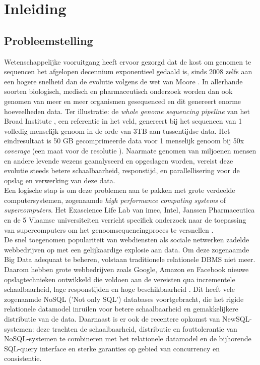 \chapter{Inleiding}
\label{cha:1}

\section{Probleemstelling}

Wetenschappelijke vooruitgang heeft ervoor gezorgd dat de kost om genomen te sequencen het afgelopen decennium exponentieel gedaald is, sinds 2008 zelfs aan een hogere snelheid dan de evolutie volgens de wet van Moore \cite{wetterstrand_sequencing_cost}. In allerhande soorten biologisch, medisch en pharmaceutisch onderzoek worden dan ook genomen van meer en meer organismen gesequenced en dit genereert enorme hoeveelheden data. Ter illustratie: de \textit{whole genome sequencing pipeline} van het Broad Institute \cite{broad_institute}, een referentie in het veld, genereert bij het sequencen van 1 volledig menselijk genoom in de orde van 3TB aan tussentijdse data. Het eindresultaat is 50 GB gecomprimeerde data voor 1 menselijk genoom bij 50x \textit{coverage} (een maat voor de resolutie \cite{coverage_definition}). Naarmate genomen van miljoenen mensen en andere levende wezens geanalyseerd en opgeslagen worden, vereist deze evolutie steeds betere schaalbaarheid, responstijd, en parallellisering voor de opslag en verwerking van deze data.\\
Een logische stap is om deze problemen aan te pakken met grote verdeelde computersystemen, zogenaamde \textit{high performance computing systems} of \textit{supercomputers}. Het Exascience Life Lab van imec, Intel, Janssen Pharmaceutica en de 5 Vlaamse universiteiten verricht specifiek onderzoek naar de toepassing van supercomputers om het genoomsequencingproces te versnellen \cite{lifelab_bwa}\cite{exascience_life_lab}.\\
De snel toegenomen populariteit van webdiensten als sociale netwerken zadelde webbedrijven op met een gelijkaardige explosie aan data. Om deze zogenaamde Big Data \cite{mashey1997big} adequaat te beheren, volstaan traditionele relationele DBMS niet meer. Daarom hebben grote webbedrijven zoals Google, Amazon en Facebook nieuwe opslagtechnieken ontwikkeld die voldoen aan de vereisten qua incrementele schaalbaarheid, lage responstijden en hoge beschikbaarheid \cite{baker2011megastore}. Dit heeft vele zogenaamde NoSQL ('Not only SQL') databases voortgebracht, die het rigide relationele datamodel inruilen voor betere schaalbaarheid en gemakkelijkere distributie van de data. Daarnaast is er ook de recentere opkomst van NewSQL-systemen: deze trachten de schaalbaarheid, distributie en fouttolerantie van NoSQL-systemen te combineren met het relationele datamodel en de bijhorende SQL-query interface en sterke garanties op gebied van concurrency en consistentie.

